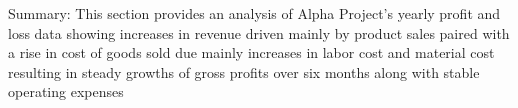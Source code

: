  Summary: This section provides an analysis of Alpha Project's yearly profit and loss data showing increases in revenue driven mainly by product sales paired with a rise in cost of goods sold due mainly increases in labor cost and material cost resulting in steady growths of gross profits over six months along with stable operating expenses